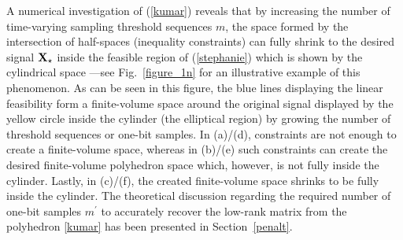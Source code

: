 \documentclass[12pt,draftcls,onecolumn]{IEEEtran}
\newcommand{\Fr}[1]{\textcolor{blue}{#1}}
\begin{document}
A numerical investigation of (\ref{kumar}) 
reveals that by increasing the number of time-varying sampling threshold sequences $m$, the space formed by the intersection of half-spaces (inequality constraints) can fully shrink to the desired signal $\mathbf{X}_{\star}$ inside the feasible region of (\ref{stephanie}) which is shown by the cylindrical space \cite{recht2011null}---see Fig.~\ref{figure_1n} for an illustrative example of this phenomenon. As can be seen in this figure, the blue lines displaying the linear feasibility form a finite-volume space around the original signal displayed by the yellow circle inside the cylinder (the elliptical region) by growing the number of threshold sequences or one-bit samples. In (a)/(d), constraints are not enough to create a finite-volume space, whereas in (b)/(e) such constraints can create the desired finite-volume polyhedron space which, however, is not fully inside the cylinder. Lastly, in (c)/(f), the created finite-volume space shrinks to be fully inside the cylinder. The theoretical discussion regarding the required number of one-bit samples $m^{\prime}$ to accurately recover the low-rank matrix from the polyhedron \eqref{kumar} has been presented in Section~\ref{penalt}.
\end{document}
